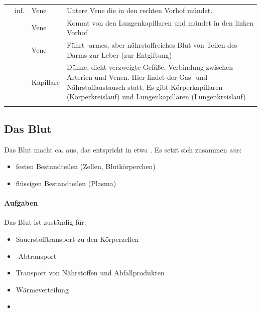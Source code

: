 \begin{gWideParEnv}
{\begin{tabulary}{\linewidth}{lllL}
&
 inf. 
&
Vene
&
Untere Vene die in den rechten Vorhof mündet.
\\\addlinespace
{} 
&
 
&
Vene
&
 Kommt von den Lungenkapillaren und
mündet in den linken Vorhof
\\\addlinespace
{} 
&
&
Vene
&
Führt -armes, aber nährstoffreiches Blut von Teilen des Darms zur
Leber (zur Entgiftung)
\\\addlinespace
{} 
&
 
&
Kapillare
&
Dünne, dicht verzweigte Gefäße, Verbindung zwischen Arterien
und Venen. Hier findet der Gas- und Nährstoffaustausch statt. Es gibt
Körperkapillaren (Körperkreislauf) und Lungenkapillaren
(Lungenkreislauf)
\\\addlinespace\bottomrule
\end{tabulary}
}
\end{gWideParEnv}

\subsection{Das Blut}\label{topic:blut}

Das Blut macht ca.  aus,
das entspricht in etwa . Es setzt sich zusammen aus:

\begin{itemize}
    \item festen Bestandteilen (Zellen, Blutkörperchen)
    \item flüssigen Bestandteilen (Plasma)
\end{itemize}

\paragraph{Aufgaben}

Das Blut ist zuständig für:
\begin{itemize}
    \item Sauerstofftransport zu den Körperzellen
    \item {}-Abtransport  
    \item Transport von Nährstoffen und Abfallprodukten
    \item Wärmeverteilung
    \item {}
\end{itemize}



